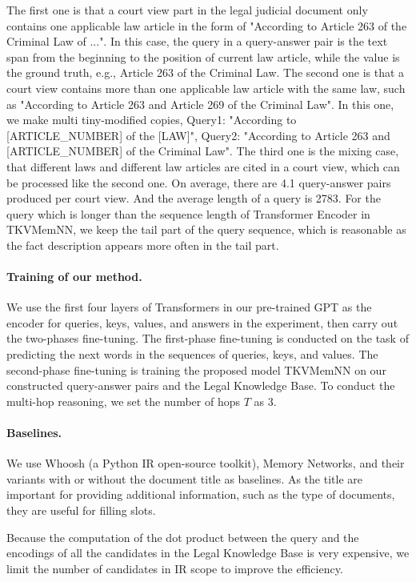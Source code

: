 \documentclass{article}
\begin{document}
The first one is that a court view part in the legal judicial document only contains one applicable law article in the form of "According to Article 263 of the Criminal Law of ...". 
In this case, the query in a query-answer pair is the text span from the beginning to the position of current law article, while the value is the ground truth, e.g., Article 263 of the Criminal Law. 
The second one is that a court view contains more than one applicable law article with the same law, such as "According to Article 263 and Article 269 of the Criminal Law". 
In this one, we make multi tiny-modified copies, Query1: "According to [ARTICLE\_NUMBER] of the [LAW]", Query2: "According to Article 263 and [ARTICLE\_NUMBER] of the Criminal Law". 
The third one is the mixing case, that different laws and different law articles are cited in a court view, which can be processed like the second one.  
On average, there are 4.1 query-answer pairs produced per court view. 
And the average length of a query is 2783. 
For the query which is longer than the sequence length of Transformer Encoder in TKVMemNN, we keep the tail part of the query sequence, which is reasonable as the fact description appears more often in the tail part.

\paragraph{Training of our method.} 
We use the first four layers of Transformers in our pre-trained GPT as the encoder for queries, keys, values, and answers in the experiment, then carry out the two-phases fine-tuning. 
The first-phase fine-tuning is conducted on the task of predicting the next words in the sequences of queries, keys, and values. 
The second-phase fine-tuning is training the proposed model TKVMemNN on our constructed query-answer pairs and the Legal Knowledge Base. 
To conduct the multi-hop reasoning, we set the number of hops $T$ as 3. 
\paragraph{Baselines.} We use Whoosh (a Python IR open-source toolkit), Memory Networks, and their variants with or without the document title as baselines. 
As the title are important for providing additional information, such as the type of documents, they are useful for filling slots. 
 
Because the computation of the dot product between the query and the encodings of all the candidates in the Legal Knowledge Base is very expensive, we limit the number of candidates in IR scope to improve the efficiency. 
\end{document}
